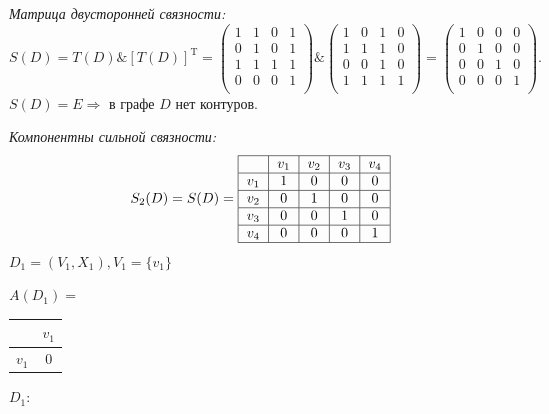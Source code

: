 \documentclass[12pt, letterpaper, titlepage]{article}
\begin{document}
\emph{Матрица двусторонней связности:}
\begin{equation*}
    S(D) = T(D) \& [T(D)]^\mathrm{T} =
    \begin{pmatrix}
        1 & 1 & 0 & 1 \\
        0 & 1 & 0 & 1 \\
        1 & 1 & 1 & 1 \\
        0 & 0 & 0 & 1 \\
    \end{pmatrix}
    \&
    \begin{pmatrix}
        1 & 0 & 1 & 0 \\
        1 & 1 & 1 & 0 \\
        0 & 0 & 1 & 0 \\
        1 & 1 & 1 & 1 \\
    \end{pmatrix}
    =
    \begin{pmatrix}
        1 & 0 & 0 & 0 \\
        0 & 1 & 0 & 0 \\
        0 & 0 & 1 & 0 \\
        0 & 0 & 0 & 1 \\
    \end{pmatrix}.
\end{equation*}
$S(D)=E\Rightarrow$ в графе $D$ нет контуров.

\emph{Компонентны сильной связности:}
\begin{equation*}
    S_2(D) = S(D) =
    \begin{tabular}{ | c | c | c | c | c | c | }
        \hline
                & $v_{1}$ & $v_{2}$ & $v_{3}$ & $v_{4}$ \\
        \hline
        $v_{1}$ & 1       & 0       & 0       & 0       \\
        \hline
        $v_{2}$ & 0       & 1       & 0       & 0       \\
        \hline
        $v_{3}$ & 0       & 0       & 1       & 0       \\
        \hline
        $v_{4}$ & 0       & 0       & 0       & 1       \\
        \hline
    \end{tabular}
\end{equation*}
$D_1=(V_1,X_1), V_1=\{v_1\}$

$A(D_1)=$
\begin{tabular}{|c|c|}
    \hline
            & $v_{1}$ \\
    \hline
    $v_{1}$ & 0       \\
    \hline
\end{tabular}\hspace{1cm}$D_1:$\hspace{1cm}

\end{document}
